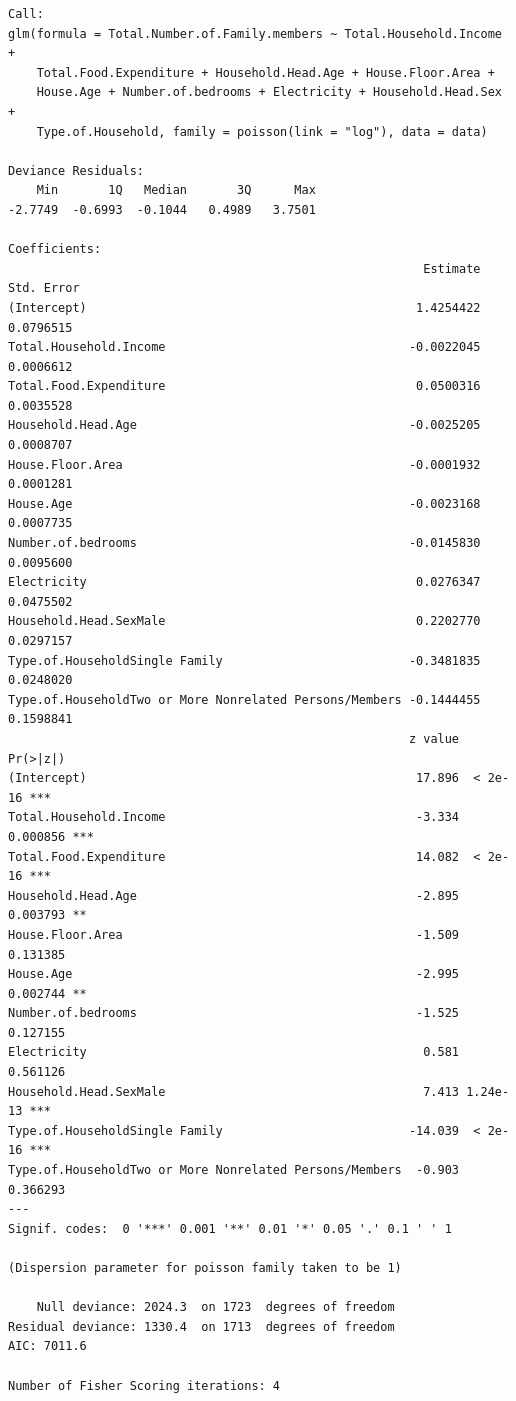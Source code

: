 \documentclass[
]{article}
\begin{document}
\begin{verbatim}
Call:
glm(formula = Total.Number.of.Family.members ~ Total.Household.Income + 
    Total.Food.Expenditure + Household.Head.Age + House.Floor.Area + 
    House.Age + Number.of.bedrooms + Electricity + Household.Head.Sex + 
    Type.of.Household, family = poisson(link = "log"), data = data)

Deviance Residuals: 
    Min       1Q   Median       3Q      Max  
-2.7749  -0.6993  -0.1044   0.4989   3.7501  

Coefficients:
                                                          Estimate Std. Error
(Intercept)                                              1.4254422  0.0796515
Total.Household.Income                                  -0.0022045  0.0006612
Total.Food.Expenditure                                   0.0500316  0.0035528
Household.Head.Age                                      -0.0025205  0.0008707
House.Floor.Area                                        -0.0001932  0.0001281
House.Age                                               -0.0023168  0.0007735
Number.of.bedrooms                                      -0.0145830  0.0095600
Electricity                                              0.0276347  0.0475502
Household.Head.SexMale                                   0.2202770  0.0297157
Type.of.HouseholdSingle Family                          -0.3481835  0.0248020
Type.of.HouseholdTwo or More Nonrelated Persons/Members -0.1444455  0.1598841
                                                        z value Pr(>|z|)    
(Intercept)                                              17.896  < 2e-16 ***
Total.Household.Income                                   -3.334 0.000856 ***
Total.Food.Expenditure                                   14.082  < 2e-16 ***
Household.Head.Age                                       -2.895 0.003793 ** 
House.Floor.Area                                         -1.509 0.131385    
House.Age                                                -2.995 0.002744 ** 
Number.of.bedrooms                                       -1.525 0.127155    
Electricity                                               0.581 0.561126    
Household.Head.SexMale                                    7.413 1.24e-13 ***
Type.of.HouseholdSingle Family                          -14.039  < 2e-16 ***
Type.of.HouseholdTwo or More Nonrelated Persons/Members  -0.903 0.366293    
---
Signif. codes:  0 '***' 0.001 '**' 0.01 '*' 0.05 '.' 0.1 ' ' 1

(Dispersion parameter for poisson family taken to be 1)

    Null deviance: 2024.3  on 1723  degrees of freedom
Residual deviance: 1330.4  on 1713  degrees of freedom
AIC: 7011.6

Number of Fisher Scoring iterations: 4
\end{verbatim}
\end{document}
